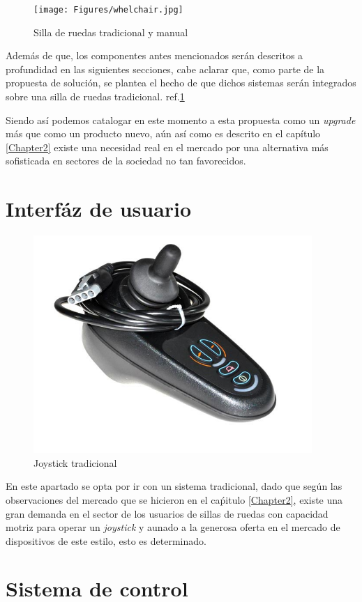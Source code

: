 \begin{figure}[th]
    \centering
    \texttt{[image: Figures/whelchair.jpg]}
    \decoRule
    \caption{Silla de ruedas tradicional y manual}
    \label{fig:manual}
\end{figure}

Adem\'as de que, los componentes antes mencionados ser\'an descritos a
profundidad en las siguientes secciones, cabe aclarar que, como parte de la
propuesta de soluci\'on, se plantea el hecho de que dichos sistemas ser\'an
integrados sobre una silla de ruedas tradicional. ref.\ref{fig:manual}

Siendo as\'i podemos catalogar en este momento a esta propuesta como un
\emph{upgrade} m\'as que como un producto nuevo, a\'un as\'i como es descrito en
el cap\'itulo \ref{Chapter2} existe una necesidad real en el mercado por una
alternativa m\'as sofisticada en sectores de la sociedad no tan favorecidos.

\section{Interf\'az de usuario}

\begin{figure}[th]
    \centering
    \includegraphics[width=.4\textwidth]{Figures/joystick.png}
    \decoRule
    \caption{Joystick tradicional}
    \label{fig:joystick}
\end{figure}
En este apartado se opta por ir con un sistema tradicional, dado que seg\'un las
observaciones del mercado que se hicieron en el ca\'pitulo \ref{Chapter2},
existe una gran demanda en el sector de los usuarios de sillas de ruedas con
capacidad motriz para operar un \emph{joystick} y aunado a la generosa oferta en
el mercado de dispositivos de este estilo, esto es determinado.\\



\section{Sistema de control}

